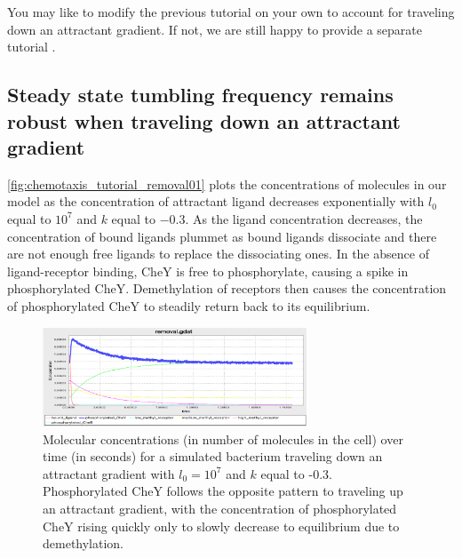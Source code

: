 \begin{qbox}\end{qbox}

You may like to modify the previous tutorial on your own to account for traveling down an attractant gradient. If not, we are still happy to provide a separate tutorial .


\FloatBarrier
{}
\subsection{Steady state tumbling frequency remains robust when traveling down an attractant gradient}

\autoref{fig:chemotaxis_tutorial_removal01} plots the concentrations of molecules in our model as the concentration of attractant ligand decreases exponentially with $l_0$ equal to $10^7$ and $k$ equal to $-0.3$. As the ligand concentration decreases, the concentration of bound ligands plummet as bound ligands dissociate and there are not enough free ligands to replace the dissociating ones. In the absence of ligand-receptor binding, CheY is free to phosphorylate, causing a spike in phosphorylated CheY. Demethylation of receptors then causes the concentration of phosphorylated CheY to steadily return back to its equilibrium.


\begin{figure}[h]
\centering
\mySfFamily
\includegraphics[width = 0.7\textwidth]{../images/chemotaxis_tutorial_removal01.png}
\caption{Molecular concentrations (in number of molecules in the cell) over time (in seconds) for a simulated bacterium traveling down an attractant gradient with $l_0 = 10^7$ and $k$ equal to -0.3. Phosphorylated CheY follows the opposite pattern to traveling up an attractant gradient, with the concentration of phosphorylated CheY rising quickly only to slowly decrease to equilibrium due to demethylation.}
\label{fig:chemotaxis_tutorial_removal01}
\end{figure}



